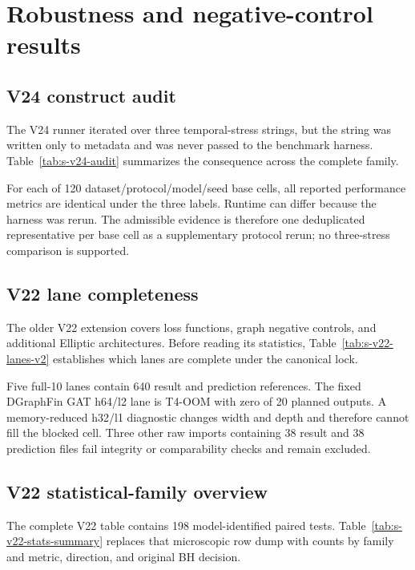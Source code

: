 \section{Robustness and negative-control results}
\label{sec:s-robustness}

\subsection{V24 construct audit}

The V24 runner iterated over three temporal-stress strings, but the string was written only to metadata and was never passed to the benchmark harness. Table~\ref{tab:s-v24-audit} summarizes the consequence across the complete family.



For each of 120 dataset/protocol/model/seed base cells, all reported performance metrics are identical under the three labels. Runtime can differ because the harness was rerun. The admissible evidence is therefore one deduplicated representative per base cell as a supplementary protocol rerun; no three-stress comparison is supported.

\subsection{V22 lane completeness}

The older V22 extension covers loss functions, graph negative controls, and additional Elliptic architectures. Before reading its statistics, Table~\ref{tab:s-v22-lanes-v2} establishes which lanes are complete under the canonical lock.



Five full-10 lanes contain 640 result and prediction references. The fixed DGraphFin GAT h64/l2 lane is T4-OOM with zero of 20 planned outputs. A memory-reduced h32/l1 diagnostic changes width and depth and therefore cannot fill the blocked cell. Three other raw imports containing 38 result and 38 prediction files fail integrity or comparability checks and remain excluded.

\subsection{V22 statistical-family overview}

The complete V22 table contains 198 model-identified paired tests. Table~\ref{tab:s-v22-stats-summary} replaces that microscopic row dump with counts by family and metric, direction, and original BH decision.

